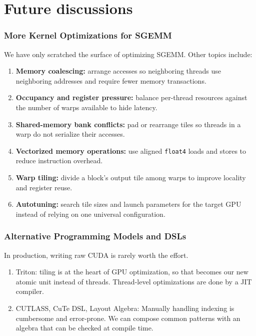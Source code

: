 \documentclass[main.tex]{subfiles}
\begin{document}
\section{Future discussions}

\begin{frame}
  \frametitle{More Kernel Optimizations for SGEMM}
  We have only scratched the surface of optimizing SGEMM.
  Other topics include:
  \begin{enumerate}
    \item \textbf{Memory coalescing:} arrange accesses so neighboring threads use
      neighboring addresses and require fewer memory transactions.
    \item \textbf{Occupancy and register pressure:} balance per-thread resources
      against the number of warps available to hide latency.
    \item \textbf{Shared-memory bank conflicts:} pad or rearrange tiles so threads
      in a warp do not serialize their accesses.
    \item \textbf{Vectorized memory operations:} use aligned \texttt{float4}
      loads and stores to reduce instruction overhead.
    \item \textbf{Warp tiling:} divide a block's output tile among warps to
      improve locality and register reuse.
    \item \textbf{Autotuning:} search tile sizes and launch parameters for the
      target GPU instead of relying on one universal configuration.
  \end{enumerate}
\end{frame}

\begin{frame}
  \frametitle{Alternative Programming Models and DSLs}
  In production, writing raw CUDA is rarely worth the effort.
  \begin{enumerate}
    \item {
        Triton: tiling is at the heart of GPU optimization, so that becomes our
        new atomic unit instead of threads. Thread-level optimizations are
        done by a JIT compiler.
      }
    \item {
        CUTLASS, CuTe DSL, Layout Algebra: Manually handling indexing is cumbersome
        and error-prone. We can compose common patterns with an algebra that can
        be checked at compile time.
      }

  \end{enumerate}
\end{frame}
\end{document}
